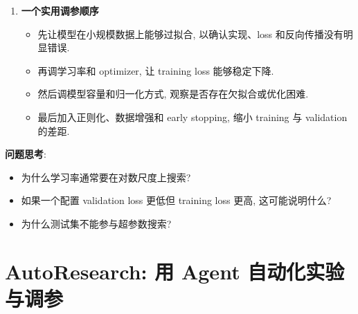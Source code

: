 \documentclass{../nndlcourse}
\begin{document}
\begin{enumerate}
\begin{itemize}
      \item 最终报告应区分 validation performance 和 test performance. 验证集用于选择配置, 测试集用于最终评估.
      \item 训练曲线应同时记录 training loss、validation loss 和任务评价指标. 只看最终 accuracy 容易掩盖 optimization 失败、过拟合和学习率不合适等问题.
      \item 学习曲线还可以用于提前判断一组配置是否值得继续训练. 若 training loss 不收敛、很快发散, 或 validation performance 长时间明显落后于已有配置, 可以用 early stopping 或 Successive Halving 中止该实验, 把计算预算留给更有希望的配置.
      \item 需要注意, 用学习曲线提前停止是资源分配策略, 不等同于最终模型训练中的 early stopping 正则化. 做超参数比较时, 应记录每个配置的训练预算、停止条件和最终指标, 否则不同配置之间的比较会不公平.
    \end{itemize}
  \item \textbf{一个实用调参顺序}
    \begin{itemize}
      \item 先让模型在小规模数据上能够过拟合, 以确认实现、loss 和反向传播没有明显错误.
      \item 再调学习率和 optimizer, 让 training loss 能够稳定下降.
      \item 然后调模型容量和归一化方式, 观察是否存在欠拟合或优化困难.
      \item 最后加入正则化、数据增强和 early stopping, 缩小 training 与 validation 的差距.
    \end{itemize}
\end{enumerate}

\textbf{问题思考}:
\begin{itemize}
  \item 为什么学习率通常要在对数尺度上搜索?
  \item 如果一个配置 validation loss 更低但 training loss 更高, 这可能说明什么?
  \item 为什么测试集不能参与超参数搜索?
\end{itemize}

\section{AutoResearch: 用 Agent 自动化实验与调参}
\end{document}

